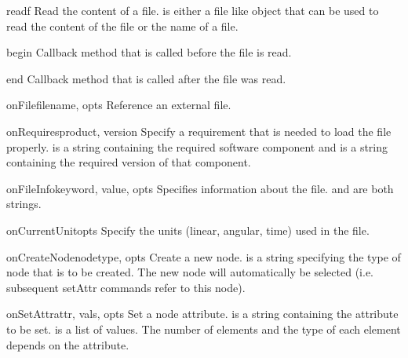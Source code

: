 \begin{methoddesc}{read}{f}
Read the content of a file.  is either a file like object that
can be used to read the content of the file or the name of a file.
\end{methoddesc}

\begin{methoddesc}{begin}{}
Callback method that is called before the file is read.
\end{methoddesc}

\begin{methoddesc}{end}{}
Callback method that is called after the file was read.
\end{methoddesc}

\begin{methoddesc}{onFile}{filename, opts}
Reference an external file.
\end{methoddesc}

\begin{methoddesc}{onRequires}{product, version}
Specify a requirement that is needed to load the file properly.
 is a string containing the required software component
and  is a string containing the required version of that
component.
\end{methoddesc}

\begin{methoddesc}{onFileInfo}{keyword, value, opts}
Specifies information about the file.  and 
are both strings.
\end{methoddesc}

\begin{methoddesc}{onCurrentUnit}{opts}
Specify the units (linear, angular, time) used in the file.
\end{methoddesc}

\begin{methoddesc}{onCreateNode}{nodetype, opts}
Create a new node.  is a string specifying the type of node
that is to be created. The new node will automatically be selected (i.e.
subsequent setAttr commands refer to this node).
\end{methoddesc}

\begin{methoddesc}{onSetAttr}{attr, vals, opts}
Set a node attribute.  is a string containing the attribute
to be set.  is a list of values. The number of elements and
the type of each element depends on the attribute.
\end{methoddesc}

